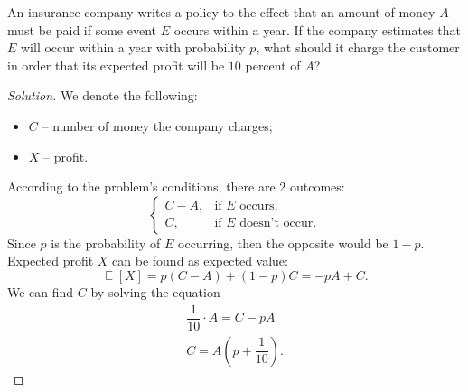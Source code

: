 \documentclass{article}[12pt]
\newenvironment{solution}
  {\renewcommand\qedsymbol{$\blacksquare$}\begin{proof}[Solution]}
  {\end{proof}}
\newenvironment{problem}[1]
  {\renewcommand\theinnercustomprblm{#1}\innercustomprblm}
  {\endinnercustomprblm}
\DeclareMathOperator{\E}{\mathbb{E}}
\begin{document}
\begin{problem}{4.27}\normalfont
An insurance company writes a policy to the effect that an amount of money $A$ must be paid if some event $E$ occurs within a year.
If the company estimates that $E$ will occur within a year with probability $p$, what should it charge the customer in order that its expected profit will be $10$ percent of $A$?
\end{problem}
\begin{solution}
We denote the following:
\begin{itemize}
    \item $C$ -- number of money the company charges;
    \item $X$ -- profit.
\end{itemize}
According to the problem's conditions, there are 2 outcomes:
\begin{equation*}
    \begin{cases}
        C - A,& \text{if $E$ occurs},
        \\
        C,& \text{if $E$ doesn't occur}.
    \end{cases}
\end{equation*}
Since $p$ is the probability of $E$ occurring, then the opposite would be $1 - p$.
Expected profit $X$ can be found as expected value:
\begin{equation*}
    \E[X] = p(C - A) + (1 - p)C = -pA + C.
\end{equation*}
We can find $C$ by solving the equation
\begin{gather*}
    \dfrac{1}{10}\cdot A = C - pA
    \\
    C = A\left(p + \dfrac{1}{10}\right).
\end{gather*}
\end{solution}
\end{document}
